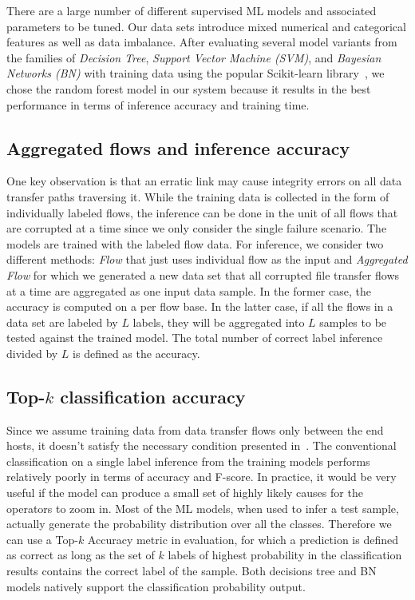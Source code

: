 There are a large number of different supervised ML models and associated parameters to be tuned. Our data sets introduce mixed numerical and categorical features as well as data imbalance. After evaluating several model variants from the families of 
{\it Decision Tree}, {\it Support Vector Machine (SVM)}, and {\it Bayesian Networks (BN)} with training data using the popular Scikit-learn library~\cite{Scikit:web}, we chose the random forest model in our system because it results in the best performance in terms of inference accuracy and training time.

\subsection{Aggregated flows and inference accuracy}
One key observation is that an erratic link may cause integrity errors on all data transfer paths traversing it. While the training data is collected in the form of individually labeled flows, the inference can be done in the unit of all flows that are corrupted at a time since we only consider the single failure scenario. The models are trained with the labeled flow data.  For inference, we consider two different methods: {\it Flow} that just uses individual flow as the input and {\it Aggregated Flow} for which we generated a new data set that all corrupted file transfer flows at a time are aggregated as one input data sample. In the former case, the accuracy is computed on a per flow base. In the latter case, if all the flows in a data set are labeled by $L$ labels, they will be aggregated into $L$ samples to be tested against the trained model. The total number of correct label inference divided by $L$ is defined as the accuracy.

\subsection{Top-$k$ classification accuracy} 
Since we assume training data from data transfer flows only between the end hosts, it doesn't satisfy the necessary condition presented in~\cite{netbouncer:nsdi18}. The conventional classification on a single label inference from the training models performs relatively poorly in terms of accuracy and F-score. In practice, it would be very useful if the model can produce a small set of highly likely causes for the operators to zoom in. Most of the ML models, when used to infer a test sample, actually generate the probability distribution over all the classes. Therefore we can use a Top-$k$ Accuracy metric in evaluation, for which a prediction is defined as correct as long as the set of $k$ labels of highest probability in the classification results contains the correct label of the sample. Both decisions tree and BN models natively support the classification probability output. 

